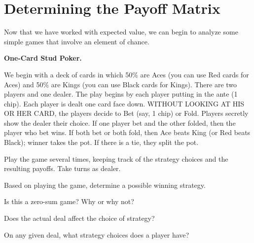 
\section{Determining the Payoff Matrix}


Now that we have worked with expected value, we can begin to analyze some simple games that involve an element of chance.


\begin{example}\label{E:onecardstud}{\bf One-Card Stud Poker.}

We begin with a deck of cards in which 50\% are Aces (you can use Red cards for Aces) and 50\% are Kings (you can use Black cards for Kings). There are two players and one dealer. The play begins by each player putting in the ante (1 chip). Each player is dealt one card face down. WITHOUT LOOKING AT HIS OR HER CARD, the players decide to Bet (say, 1 chip) or Fold. Players secretly show the dealer their choice. If one player bet and the other folded, then the player who bet wins. If both bet or both fold, then Ace beats King (or Red beats Black); winner takes the pot. If there is a tie, they split the pot.
\end{example}

\begin{xca}\label{E:playonecard}
Play the game several times, keeping track of the strategy choices and the resulting payoffs. Take turns as dealer. 
\end{xca}




\begin{xca}\label{E:onecardconjecturestrat}
Based on playing the game, determine a possible winning strategy.
\end{xca}

\begin{xca}\label{E:onecardzerosum}
Is this a zero-sum game? Why or why not?
\end{xca}

\begin{xca}
Does the actual deal affect the choice of strategy?
\end{xca}

\begin{xca}
On any given deal, what strategy choices does a player have?
\end{xca}



